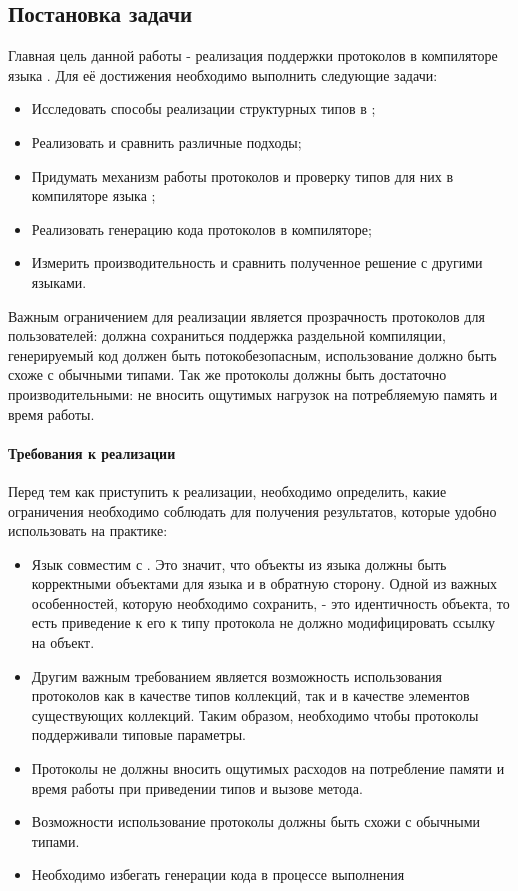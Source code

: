 \subsection{Постановка задачи}
Главная цель данной работы - реализация поддержки протоколов в компиляторе языка . Для её достижения необходимо выполнить следующие задачи:
\begin{itemize}
    \item Исследовать способы реализации структурных типов в ;
    \item Реализовать и сравнить различные подходы;
    \item Придумать механизм работы протоколов и проверку типов для них в компиляторе языка ;
    \item Реализовать генерацию кода протоколов в компиляторе;
    \item Измерить производительность и сравнить полученное решение с другими языками.
\end{itemize}

Важным ограничением для реализации является прозрачность протоколов для пользователей: должна сохраниться поддержка раздельной компиляции, генерируемый код должен быть потокобезопасным, использование должно быть схоже с обычными типами. Так же протоколы должны быть достаточно производительными: не вносить ощутимых нагрузок на потребляемую память и время работы.

\paragraph{Требования к реализации}
Перед тем как приступить к реализации, необходимо определить, какие ограничения необходимо соблюдать для получения результатов, которые удобно использовать на практике:

\begin{itemize}
  \item Язык  совместим с . Это значит, что объекты из языка  должны быть корректными объектами для языка  и в обратную сторону. Одной из важных особенностей, которую необходимо сохранить, - это идентичность объекта, то есть приведение к его к типу протокола не должно модифицировать ссылку на объект.
  \item Другим важным требованием является возможность использования протоколов как в качестве типов коллекций, так и в качестве элементов существующих коллекций. Таким образом, необходимо чтобы протоколы поддерживали типовые параметры.
  \item Протоколы не должны вносить ощутимых расходов на потребление памяти и время работы при приведении типов и вызове метода.
  \item Возможности использование протоколы должны быть схожи с обычными типами.
  \item Необходимо избегать генерации кода в процессе выполнения
\end{itemize}
